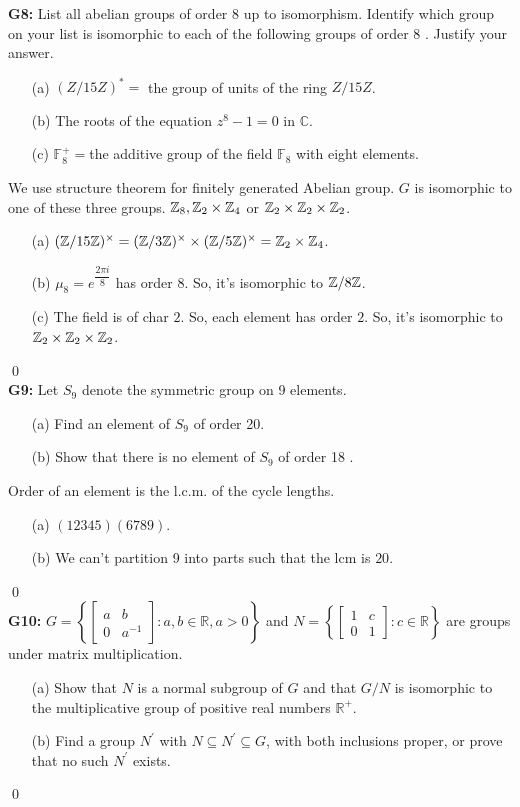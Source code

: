 \textbf{G8:} List all abelian groups of order 8 up to isomorphism. Identify which group on your list is isomorphic to each of the following groups of order 8 . Justify your answer.
\begin{itemize}
	\item[(a)] $(Z / 15 Z)^*=$ the group of units of the ring $Z / 15 Z$.
	\item[(b)] The roots of the equation $z^8-1=0 \text{ in } \mathbb{C}$.
	\item[(c)] $\mathbb{F}_8^{+}=$the additive group of the field $\mathbb{F}_8$ with eight elements.
\end{itemize}
\soln We use structure theorem for finitely generated Abelian group. $ G $ is isomorphic to one of these three groups. $ \mathbb{Z}_8, \mathbb{Z}_2\times\mathbb{Z}_4 $ or $ \mathbb{Z}_2\times \mathbb{Z}_2\times \mathbb{Z}_2 $.\\
\begin{itemize}
	\item[(a)]  $ (\mathbb{Z}/ 15\mathbb{Z})^\times = (\mathbb{Z}/3\mathbb{Z})^\times \times (\mathbb{Z}/5\mathbb{Z})^\times = \mathbb{Z}_2\times\mathbb{Z}_4 $.
	\item[(b)] $ \mu_8 = e^{\dfrac{2\pi i}{8}} $ has order 8. So, it's isomorphic to $ \mathbb{Z}/8\mathbb{Z} $.
	\item[(c)] The field is of char $ 2 $. So, each element has order $ 2 $. So, it's isomorphic to $ \mathbb{Z}_2\times \mathbb{Z}_2\times \mathbb{Z}_2 $.
\end{itemize}
\qed\\
\textbf{G9:} Let $S_9$ denote the symmetric group on 9 elements.
\begin{itemize}
	\item[(a)] Find an element of $S_9$ of order 20.
	\item[(b)] Show that there is no element of $S_9$ of order 18 .
\end{itemize}
\soln Order of an element is the l.c.m. of the cycle lengths. 
\begin{itemize}
	\item[(a)] $ (12345)(6789) $.
	\item[(b)] We can't partition 9 into parts such that the lcm is $ 20 $.
\end{itemize}
\qed\\

\textbf{G10:} $G=\left\{\left[\begin{array}{cc}a & b \\ 0 & a^{-1}\end{array}\right]: a, b \in \mathbb{R}, a>0\right\}$ and $N=\left\{\left[\begin{array}{ll}1 & c \\ 0 & 1\end{array}\right]: c \in \mathbb{R}\right\}$ are groups under matrix multiplication.
\begin{itemize}
	\item[(a)] Show that $N$ is a normal subgroup of $G$ and that $G / N$ is isomorphic to the multiplicative group of positive real numbers $\mathbb{R}^{+}$.
	\item[(b)] Find a group $N^{\prime}$ with $N \subseteq N^{\prime} \subseteq G$, with both inclusions proper, or prove that no such $N^{\prime}$ exists.
\end{itemize}
\soln 
\qed\\


